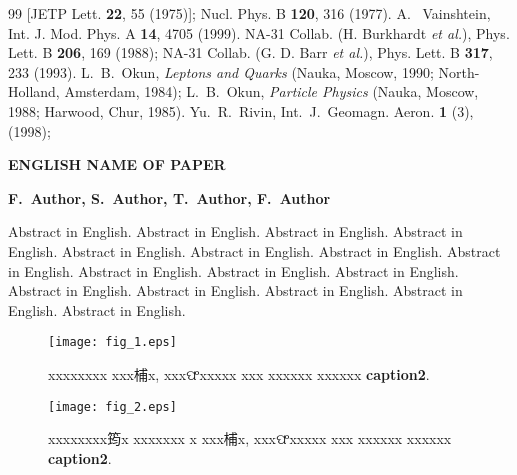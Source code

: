 \documentclass[
aps,%
12pt,%
final,%
notitlepage,%
oneside,%
onecolumn,%
nobibnotes,%
nofootinbib,%
superscriptaddress,%
noshowpacs,%
centertags]%
{revtex4}
\begin{document}
\begin{thebibliography}{99}
[JETP Lett. \textbf{22}, 55 (1975)];
Nucl. Phys. B \textbf{120}, 316 (1977).
A.~ Vainshtein, Int. J. Mod. Phys. A \textbf{14}, 4705 (1999).
NA-31 Collab. (H. Burkhardt \emph{et al.}), Phys. Lett. B \textbf{206}, 169 (1988);
NA-31 Collab. (G. D. Barr \emph{et al.}), Phys. Lett. B \textbf{317}, 233 (1993).
L.~B.~Okun, \emph{Leptons and Quarks} (Nauka, Moscow, 1990; North-Holland, Amsterdam, 1984);
L.~B.~Okun, \emph{Particle Physics} (Nauka, Moscow, 1988; Harwood, Chur, 1985).
Yu.~R.~Rivin, Int.~J.~Geomagn. Aeron. \textbf{1} (3), (1998);
\end{thebibliography}
%
\newpage
%
%
\begin{center}
\large \bfseries \MakeTextUppercase{%
English name of paper
}
\end{center}
%
\begin{center}
\bfseries F.~Author, S.~Author, T.~Author, F.~Author
\end{center}
%
\begin{center}
\begin{minipage}{\textwidth - 2cm}
\small
Abstract in English. Abstract in English. Abstract in English. Abstract in English.
Abstract in English. Abstract in English. Abstract in English. Abstract in English.
Abstract in English. Abstract in English. Abstract in English. Abstract in English.
Abstract in English. Abstract in English. Abstract in English. Abstract in English.

\end{minipage}
\end{center}
%
\newpage
\begin{figure}
\setcaptionmargin{5mm}
\onelinecaptionstrue
\texttt{[image: fig\_1.eps]} %
\caption{xxxxxxxx xxx㭪x, xxxଫxxxxx
xxx xxxxxx xxxxxx \textbf{caption2}.}
\end{figure}

\begin{figure}[t!]
\setcaptionmargin{5mm}
\onelinecaptionstrue  %
\texttt{[image: fig\_2.eps]}
 \caption{xxxxxxxx筠x xxxxxxx x xxx㭪x,
xxxଫxxxxx xxx xxxxxx xxxxxx \textbf{caption2}.}
\end{figure}
\end{document}
